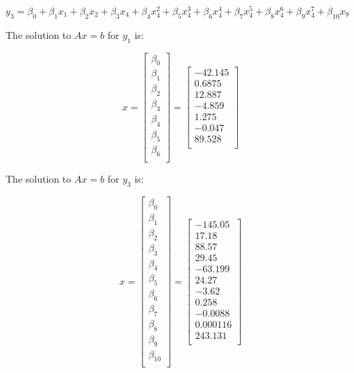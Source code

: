 \documentclass[
]{article}
\begin{document}
\(y_{3} = \beta_{0} + \beta_{1}x_{1} + \beta_{2}x_{2} + \beta_{3}x_{4} + \beta_{4}x_{4}^{2} + \beta_{5}x_{4}^{3} + \beta_{6}x_{4}^{4} + \beta_{7}x_{4}^{5} + \beta_{8}x_{4}^{6} + \beta_{9}x_{4}^{7} + \beta_{10}x_{9}\)

The solution to \(Ax = b\) for \(y_{1}\) is:

\[
x =
  \begin{bmatrix}
    \beta_{0} \\
     \beta_{1} \\
    \beta_{2} \\
     \beta_{3}\\
     \beta_{4} \\
    \beta_{5} \\
    \beta_{6} \\
  \end{bmatrix} =
  \begin{bmatrix}
    -42.145 \\
    0.6875 \\
    12.887 \\
    -4.859 \\
    1.275 \\
    -0.047 \\
    89.528 \\
  \end{bmatrix}
\]

The solution to \(Ax = b\) for \(y_{3}\) is:

\[
x =
  \begin{bmatrix}
    \beta_{0} \\
     \beta_{1} \\
    \beta_{2} \\
     \beta_{3}\\
     \beta_{4} \\
    \beta_{5} \\
    \beta_{6} \\
    \beta_{7}\\
     \beta_{8} \\
    \beta_{9} \\
    \beta_{10} \\
  \end{bmatrix} =
  \begin{bmatrix}
    -145.05 \\
    17.18 \\
    88.57 \\
    29.45 \\
    -63.199 \\
    24.27 \\
    -3.62 \\
    0.258 \\
    -0.0088 \\
    0.000116 \\
    243.131 \\
  \end{bmatrix} 
\]
\end{document}
